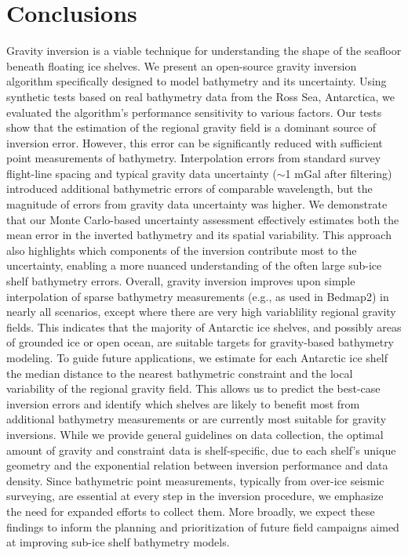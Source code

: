 \documentclass[tc, manuscript]{copernicus}
\begin{document}
\section{Conclusions}

Gravity inversion is a viable technique for understanding the shape of the seafloor beneath floating ice shelves. We present an open-source gravity inversion algorithm specifically designed to model bathymetry and its uncertainty. Using synthetic tests based on real bathymetry data from the Ross Sea, Antarctica, we evaluated the algorithm's performance sensitivity to various factors. Our tests show that the estimation of the regional gravity field is a dominant source of inversion error. However, this error can be significantly reduced with sufficient point measurements of bathymetry. Interpolation errors from standard survey flight-line spacing and typical gravity data uncertainty ($\sim$1 mGal after filtering) introduced additional bathymetric errors of comparable wavelength, but the magnitude of errors from gravity data uncertainty was higher. We demonstrate that our Monte Carlo-based uncertainty assessment effectively estimates both the mean error in the inverted bathymetry and its spatial variability. This approach also highlights which components of the inversion contribute most to the uncertainty, enabling a more nuanced understanding of the often large sub-ice shelf bathymetry errors. Overall, gravity inversion improves upon simple interpolation of sparse bathymetry measurements (e.g., as used in Bedmap2) in nearly all scenarios, except where there are very high variablility regional gravity fields. This indicates that the majority of Antarctic ice shelves, and possibly areas of grounded ice or open ocean, are suitable targets for gravity-based bathymetry modeling. To guide future applications, we estimate for each Antarctic ice shelf the median distance to the nearest bathymetric constraint and the local variability of the regional gravity field. This allows us to predict the best-case inversion errors and identify which shelves are likely to benefit most from additional bathymetry measurements or are currently most suitable for gravity inversions. While we provide general guidelines on data collection, the optimal amount of gravity and constraint data is shelf-specific, due to each shelf's unique geometry and the exponential relation between inversion performance and data density. Since bathymetric point measurements, typically from over-ice seismic surveying, are essential at every step in the inversion procedure, we emphasize the need for expanded efforts to collect them. More broadly, we expect these findings to inform the planning and prioritization of future field campaigns aimed at improving sub-ice shelf bathymetry models.
\end{document}
